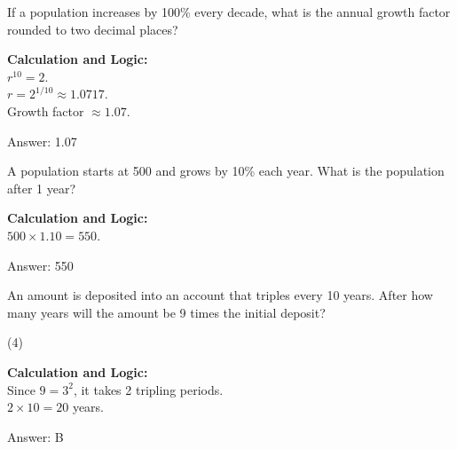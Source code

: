 \documentclass[11pt,paper=a4,answers]{exam}
\begin{document}
\begin{questions}
\question
If a population increases by 100\% every decade, what is the annual growth factor rounded to two decimal places?

\begin{solution}
\textbf{Calculation and Logic:} \\
$r^{10} = 2$. \\
$r = 2^{1/10} \approx 1.0717$. \\
Growth factor $\approx 1.07$.

\vspace{25pt}

Answer: \colorbox{yellow!100}{1.07}
\end{solution}

\vspace{40pt}

\question
A population starts at 500 and grows by 10\% each year. What is the population after 1 year?

\begin{solution}
\textbf{Calculation and Logic:} \\
$500 \times 1.10 = 550$.

\vspace{25pt}

Answer: \colorbox{yellow!100}{550}
\end{solution}

\vspace{40pt}

\question
An amount is deposited into an account that triples every 10 years. After how many years will the amount be 9 times the initial deposit?
\begin{tasks}(4)
\end{tasks}

\begin{solution}
\textbf{Calculation and Logic:} \\
Since $9 = 3^2$, it takes 2 tripling periods. \\
$2 \times 10 = 20$ years.

\vspace{25pt}

Answer: \colorbox{yellow!100}{B}
\end{solution}


\end{questions}
\end{document}
